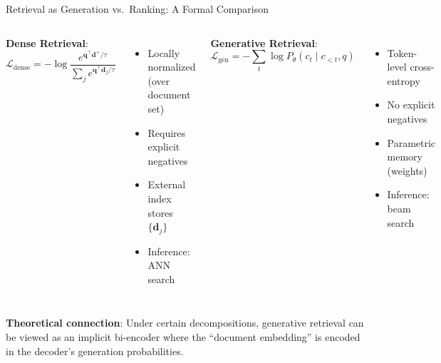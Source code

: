 \documentclass[aspectratio=169,11pt]{beamer}
\newcommand{\vq}{\mathbf{q}}
\newcommand{\vd}{\mathbf{d}}
\begin{document}
\begin{frame}{Retrieval as Generation vs.\ Ranking: A Formal Comparison}
\begin{columns}[T]
\textbf{Dense Retrieval}:
\[
\mathcal{L}_{\text{dense}} = -\log \frac{e^{\vq^\top \vd^+ / \tau}}{\sum_{j} e^{\vq^\top \vd_j / \tau}}
\]

\begin{itemize}
    \item Locally normalized (over document set)
    \item Requires explicit negatives
    \item External index stores $\{\vd_j\}$
    \item Inference: ANN search
\end{itemize}

\textbf{Generative Retrieval}:
\[
\mathcal{L}_{\text{gen}} = -\sum_{t} \log P_\theta(c_t \mid c_{<t}, q)
\]

\begin{itemize}
    \item Token-level cross-entropy
    \item No explicit negatives
    \item Parametric memory (weights)
    \item Inference: beam search
\end{itemize}
\end{columns}

\vspace{0.4cm}
\textbf{Theoretical connection}: Under certain decompositions, generative retrieval can be viewed as an implicit bi-encoder where the ``document embedding'' is encoded in the decoder's generation probabilities.
\end{frame}

\end{document}

